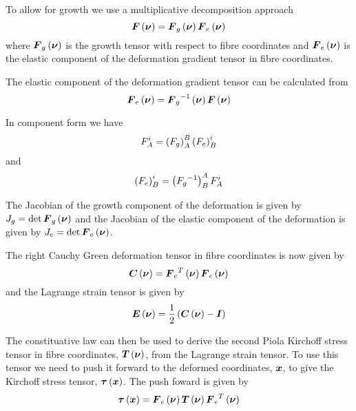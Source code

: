 To allow for growth we use a multiplicative decomposition approach \ie
\begin{equation}
   \boldsymbol{F}\left( \boldsymbol{\nu} \right) = \boldsymbol{F}_{g}\left( \boldsymbol{\nu} \right)  \boldsymbol{F}_{e}\left( \boldsymbol{\nu} \right) 
\end{equation}
where $ \boldsymbol{F}_{g}\left( \boldsymbol{\nu} \right) $ is the growth tensor with
respect to fibre coordinates and $ \boldsymbol{F}_{e}\left( \boldsymbol{\nu} \right) $ is the
elastic component of the deformation gradient tensor in fibre coordinates.

The elastic component of the deformation gradient tensor can be calculated
from
\begin{equation}
   \boldsymbol{F}_{e}\left( \boldsymbol{\nu} \right) = {\boldsymbol{F}_{g}}^{-1}\left( \boldsymbol{\nu} \right)  \boldsymbol{F}\left( \boldsymbol{\nu} \right) 
\end{equation}

In component form we have
\begin{equation}
  F^{i}_{A}=\left( F_{g} \right)^{B}_{A}\left( F_{e} \right)^{i}_{B}
\end{equation}
and
\begin{equation}
  \left( F_{e} \right)^{i}_{B}=\left( {F_{g}}^{-1} \right)^{A}_{B}F^{i}_{A}
\end{equation}

The Jacobian of the growth component of the deformation is given by
$J_{g}=\det{\ensuremath{ \boldsymbol{F}_{g}\left( \boldsymbol{\nu} \right) }}$ and the Jacobian of the
elastic component of the deformation is given by
$J_{e}=\det{\ensuremath{ \boldsymbol{F}_{e}\left( \boldsymbol{\nu} \right) }}$.

The right Cauchy Green deformation tensor in fibre coordinates is now given by
\begin{equation}
   \boldsymbol{C}\left( \boldsymbol{\nu} \right) = {\boldsymbol{F}_{e}}^{T}\left( \boldsymbol{\nu} \right)  \boldsymbol{F}_{e}\left( \boldsymbol{\nu} \right) 
\end{equation}
and the Lagrange strain tensor is given by
\begin{equation}
   \boldsymbol{E}\left( \boldsymbol{\nu} \right) =\frac{1}{2}\left(  \boldsymbol{C}\left( \boldsymbol{\nu} \right) -\boldsymbol{I} \right)
\end{equation}

The constituative law can then be used to derive the second Piola Kirchoff
stress tensor in fibre coordinates, $ \boldsymbol{T}\left( \boldsymbol{\nu} \right) $, from the
Lagrange strain tensor. To use this tensor we need to push it forward to the
deformed coordinates, $\boldsymbol{x}$, to give the Kirchoff stress tensor,
$ \boldsymbol{\tau}\left( \boldsymbol{x} \right) $. The push foward is given by
\begin{equation}
   \boldsymbol{\tau}\left( \boldsymbol{x} \right) = \boldsymbol{F}_{e}\left( \boldsymbol{\nu} \right)  \boldsymbol{T}\left( \boldsymbol{\nu} \right) 
   {\boldsymbol{F}_{e}}^{T}\left( \boldsymbol{\nu} \right) 
\end{equation}


